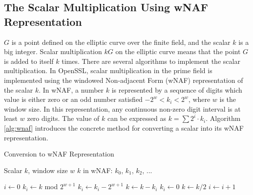 

\subsection{The Scalar Multiplication Using wNAF Representation}
\label{intro_wnaf}
$G$ is a point defined on the elliptic curve over the finite field,
 and the scalar $k$ is a big integer.
Scalar multiplication $kG$ on the elliptic curve means that the point $G$ is added to itself $k$ times.
There are several algorithms to implement the scalar multiplication.
In OpenSSL, scalar multiplication in the prime field is implemented using the windowed Non-adjacent Form (wNAF) representation \cite{GORDON1998129,Miyaji1997,Koyama1002,Solinas2000} of the scalar $k$.
In wNAF, a number $k$ is represented by a sequence of digits which value is either zero or an odd number satisfied $-2^{w} < k_{i} < 2^{w}$,
 where $w$ is the window size. In this representation, any continuous non-zero digit interval is at least $w$ zero digits.
The value of $k$ can be expressed as $k = \sum{2^{i}\cdot k_{i}}$.
Algorithm \ref{alg:wnaf} introduces the concrete method for converting a scalar into its wNAF representation.

\renewcommand{\algorithmicrequire}{\textbf{Input:}}
\renewcommand{\algorithmicensure}{\textbf{Output:}}

 \begin{algorithm}[t]
        \caption{Conversion to wNAF Representation}
        \label{alg:wnaf}
        \begin{algorithmic}[1]
            \Require Scalar $k$, window size $w$
            \Ensure $k$ in wNAF: $k_0$, $k_1$, $k_2$, ...

            \State $i \gets 0$
                    \State $k_i \gets k$ mod $2^{w+1}$
                        \State $k_{i} \gets k_{i} - 2^{w+1}$
                    \EndIf
                    \State $k \gets k - k_{i}$
                \Else
                    \State $k_{i} \gets 0 $
                \EndIf
                \State $k \gets k/2 $
                \State $i \gets i+1 $
            \EndWhile
        \end{algorithmic}
    \end{algorithm}


